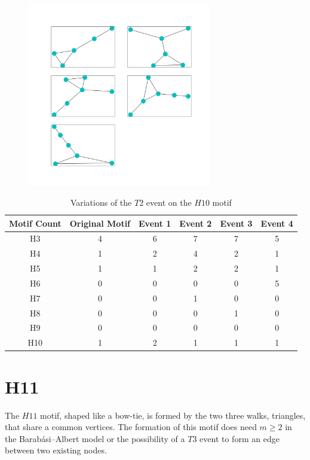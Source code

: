 \begin{figure}[!ht]
    \includegraphics[width=8cm]{Images/H10_evolution.png}
    \centering
\end{figure}

\begin{table}
    \centering
    \begin{tabular}{||c c c c c c ||} 
    \hline
    Motif Count & Original Motif & Event 1 & Event 2 & Event 3  & Event 4 \\ [0.5ex] 
    \hline\hline
    H3 & 4 & 6 & 7 & 7  & 5\\
    \hline
    H4 & 1 & 2 & 4 & 2  & 1\\
    \hline
    H5 & 1 & 1 & 2 & 2 & 1\\
    \hline
    H6 & 0 & 0 & 0 & 0  & 5\\
    \hline
    H7 & 0 & 0 & 1 & 0 & 0 \\
    \hline
    H8 & 0 & 0 & 0 & 1 & 0 \\
    \hline
    H9 & 0 & 0 & 0 & 0  & 0 \\
    \hline
    H10 & 1 & 2 & 1 & 1 & 1 \\
    \hline
   \end{tabular}
   \caption{Variations of the $T2$ event on the $H10$ motif}
   \label{table:8}
\end{table}

\FloatBarrier

\section{H11}
The $H11$ motif, shaped like a bow-tie, is formed by the two three walks, triangles, that share a common
vertices. The formation of this motif does need $m \geq 2$ in the Barabási–Albert model or 
the possibility of a $T3$ event to form an edge between two existing nodes. 

